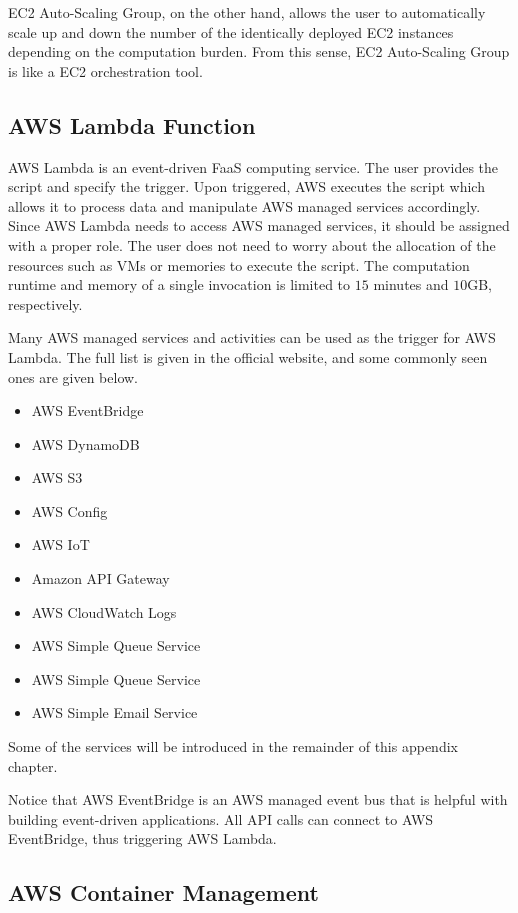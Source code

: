 EC2 Auto-Scaling Group, on the other hand, allows the user to automatically scale up and down the number of the identically deployed EC2 instances depending on the computation burden. From this sense, EC2 Auto-Scaling Group is like a EC2 orchestration tool.

\subsection{AWS Lambda Function}

AWS Lambda is an event-driven FaaS computing service. The user provides the script and specify the trigger. Upon triggered, AWS executes the script which allows it to process data and manipulate AWS managed services accordingly. Since AWS Lambda needs to access AWS managed services, it should be assigned with a proper role. The user does not need to worry about the allocation of the resources such as VMs or memories to execute the script. The computation runtime and memory of a single invocation is limited to $15$ minutes and $10$GB, respectively. 

Many AWS managed services and activities can be used as the trigger for AWS Lambda. The full list is given in the official website, and some commonly seen ones are given below.
\begin{itemize}
	\item AWS EventBridge
	\item AWS DynamoDB
	\item AWS S3
	\item AWS Config
	\item AWS IoT
	\item Amazon API Gateway
	\item AWS CloudWatch Logs
	\item AWS Simple Queue Service
	\item AWS Simple Queue Service
	\item AWS Simple Email Service
\end{itemize}
Some of the services will be introduced in the remainder of this appendix chapter.

Notice that AWS EventBridge is an AWS managed event bus that is helpful with building event-driven applications. All API calls can connect to AWS EventBridge, thus triggering AWS Lambda.

\subsection{AWS Container Management}

